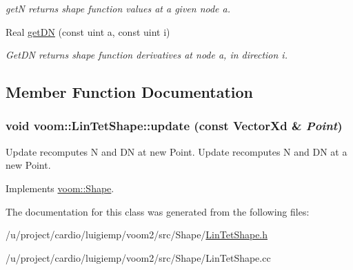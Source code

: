 \begin{DoxyCompactItemize}
\begin{DoxyCompactList}\small\item\em getN returns shape function values at a given node a. \item\end{DoxyCompactList}\item 
\hypertarget{classvoom_1_1_lin_tet_shape_a73f4e058efacab88451e81ef1832aa48}{
Real \hyperlink{classvoom_1_1_lin_tet_shape_a73f4e058efacab88451e81ef1832aa48}{getDN} (const uint a, const uint i)}
\label{classvoom_1_1_lin_tet_shape_a73f4e058efacab88451e81ef1832aa48}

\begin{DoxyCompactList}\small\item\em GetDN returns shape function derivatives at node a, in direction i. \item\end{DoxyCompactList}\end{DoxyCompactItemize}


\subsection{Member Function Documentation}
\hypertarget{classvoom_1_1_lin_tet_shape_a9a1ac89c0cfd33e4d1eb459b2d9c595e}{
\subsubsection[{update}]{\setlength{\rightskip}{0pt plus 5cm}void voom::LinTetShape::update (const VectorXd \& {\em Point})}}
\label{classvoom_1_1_lin_tet_shape_a9a1ac89c0cfd33e4d1eb459b2d9c595e}


Update recomputes N and DN at new Point. Update recomputes N and DN at a new Point. 

Implements \hyperlink{classvoom_1_1_shape_a8ded544de12647543b056cec61be9f26}{voom::Shape}.

The documentation for this class was generated from the following files:\begin{DoxyCompactItemize}
\item 
/u/project/cardio/luigiemp/voom2/src/Shape/\hyperlink{_lin_tet_shape_8h}{LinTetShape.h}\item 
/u/project/cardio/luigiemp/voom2/src/Shape/LinTetShape.cc\end{DoxyCompactItemize}
